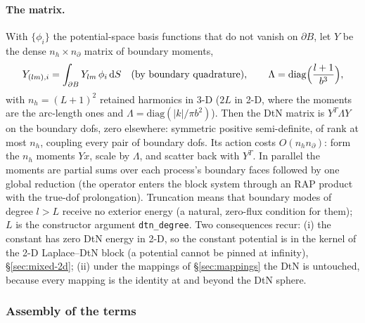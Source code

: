 \documentclass[11pt]{article}
\numberwithin{equation}{section}
\theoremstyle{remark}
\newcommand{\dS}{\,\mathrm{d}S}
\newcommand{\code}[1]{\texttt{#1}}
\begin{document}
\paragraph{The matrix.} With $\{\phi_i\}$ the potential-space basis
functions that do not vanish on $\partial B$, let $Y$ be the dense
$n_h\times n_\partial$ matrix of boundary moments,
\begin{equation}
  Y_{(lm),i} = \int_{\partial B}Y_{lm}\,\phi_i\dS
  \quad(\text{by boundary quadrature}), \qquad
  \Lambda = \mathrm{diag}\Bigl(\frac{l+1}{b^3}\Bigr),
  \label{eq:dtnmatrix}
\end{equation}
with $n_h = (L+1)^2$ retained harmonics in 3-D ($2L$ in 2-D, where the
moments are the arc-length ones and $\Lambda = \mathrm{diag}(|k|/\pi b^2)$).
Then the DtN
matrix is $Y^T\Lambda Y$ on the boundary dofs, zero elsewhere: symmetric
positive semi-definite, of rank at most $n_h$, coupling every pair of
boundary dofs. Its action costs $O(n_hn_\partial)$: form the $n_h$ moments
$Y x$, scale by $\Lambda$, and scatter back with $Y^T$. In parallel the
moments are partial sums over each process's boundary faces followed by one
global reduction (the operator enters the block system through an RAP
product with the true-dof prolongation). Truncation means that boundary
modes of degree $l > L$ receive no exterior energy (a natural, zero-flux
condition for them); $L$ is the constructor argument \code{dtn\_degree}.
Two consequences recur: (i) the constant has zero DtN energy in 2-D, so the
constant potential is in the kernel of the 2-D Laplace--DtN block (a
potential cannot be pinned at infinity), \S\ref{sec:mixed-2d}; (ii) under
the mappings of \S\ref{sec:mappings} the DtN is untouched, because every
mapping is the identity at and beyond the DtN sphere.

\subsubsection{Assembly of the terms}
\end{document}
